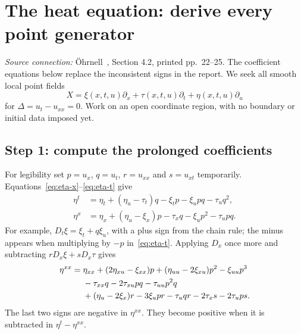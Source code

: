 \documentclass[11pt,a4paper]{article}
\numberwithin{equation}{section}
\theoremstyle{definition}
\theoremstyle{plain}
\theoremstyle{remark}
\newcommand{\source}[1]{\textit{Source connection:} \"Ohrnell~\cite{ohrnell}, #1.}
\begin{document}
\section{The heat equation: derive every point generator}\label{sec:heat}
\source{Section 4.2, printed pp.~22--25. The coefficient equations below replace the inconsistent signs in the report}
We seek all smooth local point fields
\[
X=\xi(x,t,u)\partial_x+\tau(x,t,u)\partial_t+\eta(x,t,u)\partial_u
\]
for $\Delta=u_t-u_{xx}=0$. Work on an open coordinate region, with no boundary or initial data imposed yet.

\subsection{Step 1: compute the prolonged coefficients}
For legibility set $p=u_x$, $q=u_t$, $r=u_{xx}$ and $s=u_{xt}$ temporarily. Equations~\eqref{eq:eta-x}--\eqref{eq:eta-t} give
\begin{align*}
\eta^t&=\eta_t+(\eta_u-\tau_t)q-\xi_t p-\xi_upq-\tau_uq^2,\\
\eta^x&=\eta_x+(\eta_u-\xi_x)p-\tau_xq-\xi_up^2-\tau_upq.
\end{align*}
For example, $D_t\xi=\xi_t+q\xi_u$, with a plus sign from the chain rule; the minus appears when multiplying by $-p$ in~\eqref{eq:eta-t}. Applying $D_x$ once more and subtracting $rD_x\xi+sD_x\tau$ gives
\begin{align}
\eta^{xx}={}&\eta_{xx}+(2\eta_{xu}-\xi_{xx})p+(\eta_{uu}-2\xi_{xu})p^2-\xi_{uu}p^3\notag\\
&-\tau_{xx}q-2\tau_{xu}pq-\tau_{uu}p^2q\notag\\
&+(\eta_u-2\xi_x)r-3\xi_upr-\tau_uqr-2\tau_xs-2\tau_ups.
\label{eq:full-heat-prolong}
\end{align}
The last two signs are negative in $\eta^{xx}$. They become positive when it is subtracted in $\eta^t-\eta^{xx}$.
\end{document}
